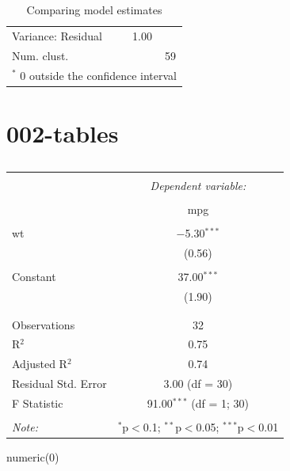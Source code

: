 \documentclass[10pt]{beamer}\usepackage[]{graphicx}\usepackage[]{color}
\begin{document}
\begin{frame}
\begin{table}
\begin{center}
\begin{scriptsize}
\begin{tabular}{l c c c }
Variance: Residual            &                                         & 1.00                                 &                                      \\
Num. clust.                   &                                         &                                      & 59                                   \\
\hline
\multicolumn{4}{l}{\tiny{$^*$ 0 outside the confidence interval}}
\end{tabular}
\end{scriptsize}
\caption{Comparing model estimates}
\label{table:coefficients}
\end{center}
\end{table}

\end{frame}


\section{002-tables}
\begin{frame}

\begin{table}[!htbp] \centering 
  \caption{} 
  \label{} 
\begin{tabular}{@{\extracolsep{5pt}}lc} 
\\[-1.8ex]\hline 
\hline \\[-1.8ex] 
 & \multicolumn{1}{c}{\textit{Dependent variable:}} \\ 
\cline{2-2} 
\\[-1.8ex] & mpg \\ 
\hline \\[-1.8ex] 
 wt & $-$5.30$^{***}$ \\ 
  & (0.56) \\ 
  & \\ 
 Constant & 37.00$^{***}$ \\ 
  & (1.90) \\ 
  & \\ 
\hline \\[-1.8ex] 
Observations & 32 \\ 
R$^{2}$ & 0.75 \\ 
Adjusted R$^{2}$ & 0.74 \\ 
Residual Std. Error & 3.00 (df = 30) \\ 
F Statistic & 91.00$^{***}$ (df = 1; 30) \\ 
\hline 
\hline \\[-1.8ex] 
\textit{Note:}  & \multicolumn{1}{r}{$^{*}$p$<$0.1; $^{**}$p$<$0.05; $^{***}$p$<$0.01} \\ 
\end{tabular} 
\end{table} 
numeric(0)

\end{frame}
\end{document}
